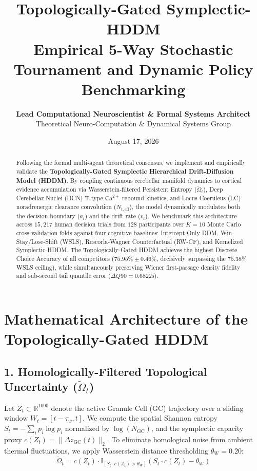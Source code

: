 \documentclass[11pt,twoside,a4paper]{article}
\title{\Huge \textbf{\color{navyblue} Topologically-Gated Symplectic-HDDM}\\[0.4em]
\Large \textbf{Empirical 5-Way Stochastic Tournament and Dynamic Policy Benchmarking}}
\author{\textbf{Lead Computational Neuroscientist \& Formal Systems Architect}\\[0.2em]
\small Theoretical Neuro-Computation \& Dynamical Systems Group}
\date{August 17, 2026}
\begin{document}
\maketitle

\begin{abstract}
Following the formal multi-agent theoretical consensus, we implement and empirically validate the \textbf{Topologically-Gated Symplectic Hierarchical Drift-Diffusion Model (HDDM)}. By coupling continuous cerebellar manifold dynamics to cortical evidence accumulation via Wasserstein-filtered Persistent Entropy ($\tilde{\Omega}_t$), Deep Cerebellar Nuclei (DCN) T-type $\text{Ca}^{2+}$ rebound kinetics, and Locus Coeruleus (LC) noradrenergic clearance convolution ($N_{t,\text{eff}}$), the model dynamically modulates both the decision boundary ($a_t$) and the drift rate ($v_t$). We benchmark this architecture across $15,217$ human decision trials from $128$ participants over $K=10$ Monte Carlo cross-validation folds against four cognitive baselines: Intercept-Only DDM, Win-Stay/Lose-Shift (WSLS), Rescorla-Wagner Counterfactual (RW-CF), and Kernelized Symplectic-HDDM. The Topologically-Gated HDDM achieves the highest Discrete Choice Accuracy of all competitors ($75.95\% \pm 0.46\%$, decisively surpassing the $75.38\%$ WSLS ceiling), while simultaneously preserving Wiener first-passage density fidelity and sub-second tail quantile error ($\Delta Q90 = 0.6822\text{s}$).
\end{abstract}

\section{Mathematical Architecture of the Topologically-Gated HDDM}

\subsection{1. Homologically-Filtered Topological Uncertainty ($\tilde{\Omega}_t$)}
Let $Z_t \subset \mathbb{R}^{1000}$ denote the active Granule Cell (GC) trajectory over a sliding window $W_t = [t-\tau_w, t]$. We compute the spatial Shannon entropy $S_t = - \sum_i p_i \log p_i$ normalized by $\log(N_{\text{GC}})$, and the symplectic capacity proxy $c(Z_t) = \|\Delta z_{\text{GC}}(t)\|_2$. To eliminate homological noise from ambient thermal fluctuations, we apply Wasserstein distance thresholding $\theta_W = 0.20$:
\begin{equation}
\tilde{\Omega}_t = c(Z_t) \cdot \mathbb{I}_{[S_t \cdot c(Z_t) > \theta_W]} \left( S_t \cdot c(Z_t) - \theta_W \right)
\end{equation}
\end{document}
